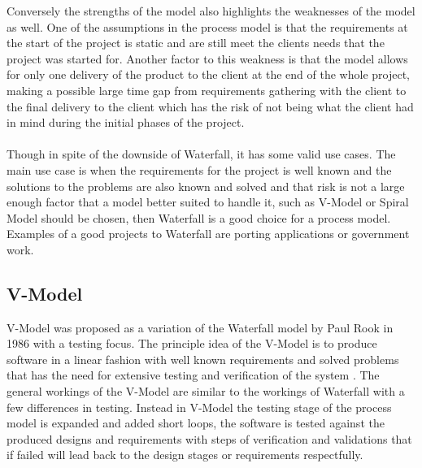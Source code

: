\documentclass{style/CRPITStyle}
\renewcommand{\cite}{\citep}
\begin{document}
Conversely the strengths of the model also highlights the weaknesses of the model as
well.
One of the assumptions in the process model is that the requirements at the start of the project is
static and are still meet the clients needs that the project was started for.
Another factor to this weakness is that the model allows for only one delivery of the product to
the client at the end of the whole project, making a possible large time gap from requirements 
gathering with the client to the final delivery to the client which has the risk of not being 
what the client had in mind during the initial phases of the project.

\paragraph{}
Though in spite of the downside of Waterfall, it has some valid use cases.
The main use case is when the requirements for the project is well known and the
solutions to the problems are also known and solved and that risk is not a large
enough factor that a model better suited to handle it, such as V-Model or Spiral
Model should be chosen, then Waterfall is a good choice for a process model.
Examples of a good projects to Waterfall are porting applications or government
work.

\subsection{V-Model} %

V-Model was proposed as a variation of the Waterfall model by Paul Rook in 1986
\cite{rook:1986:vmodel} with a testing focus.
The principle idea of the V-Model is to produce software in a linear fashion with
well known requirements and solved problems that has the need for extensive testing 
and verification of the system \cite{rook:1986:vmodel}.
The general workings of the V-Model are similar to the workings of Waterfall
with a few differences in testing.
Instead in V-Model the testing stage of the process model is expanded and added short loops,
the software is tested against the produced designs and requirements with
steps of verification and validations  that if failed will lead back to the design
stages or requirements respectfully.
\end{document}
